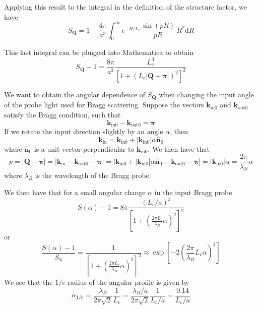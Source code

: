 \documentclass[11pt,letter]{article}
\newcommand{\bv}[1]{\ensuremath{\bm{#1}}}
\begin{document}
Applying this result to the integral in the definition of the structure factor,
we have
\begin{equation}
S_{\bv{Q}} = 1 +  
   \frac{4\pi}{a^{3}}
   \int_{0}^{\infty}  
   e^{-R/ L_{c} }  
   \frac{ \sin(pR)}{pR}\, R^{2} 
  \mathrm{d}R
\end{equation}

This last integral can be plugged into Mathematica to obtain
\begin{equation}
S_{\bv{Q}} - 1 = 
    \frac{8\pi}{a^{3}} 	\frac{ L_{c}^{3} }
     { \left[ 1 + (L_{c} |\bv{Q}-\bv{\pi}|)^{2}  \right]^{2} } 
\end{equation}

We want to obtain the angular dependence of $S_{\bv{Q}}$ when changing the
input angle of the probe light used for Bragg scattering.  Suppose the vectors
$\bv{k}_{\text{in}0}$ and $\bv{k}_{\text{out}0}$ satisfy the Bragg condition,
such that
\begin{equation}
 \bv{k}_{\text{in}0} - 
 \bv{k}_{\text{out}0}   = \bv{\pi} 
\end{equation} 
If we rotate the input direction slightly by an angle $\alpha$, then 
\begin{equation} 
 \bv{k}_{\text{in}} = 
 \bv{k}_{\text{in}0}  +  
 |\bv{k}_{\text{in}0}|\alpha \bv{\hat{n}}_{0}
\end{equation}
where $\bv{\hat{n}}_{0}$ is a unit vector perpendicular to
$\bv{k}_{\text{in}0}$.  We then have that 
\begin{equation} 
 p = | \bv{Q} - \bv{\pi} | = 
 | \bv{k}_{\text{in}} - 
 \bv{k}_{\text{out}0}  - \bv{\pi}  | =
 |\bv{k}_{\text{in}0}  +  
 |\bv{k}_{\text{in}0}|\alpha \bv{\hat{n}}_{0} - 
 \bv{k}_{\text{out}0}  - \bv{\pi} |  = 
 |\bv{k}_{\text{in}0}|\alpha  = \frac{2\pi}{\lambda_{B}} \alpha  
\end{equation}
where $\lambda_{B}$ is the wavelength of the Bragg probe.

We then have that for a small angular change $\alpha$ in the input Bragg probe
\begin{equation}
S(\alpha) - 1 = 
    8\pi \frac{ (L_{c}/a)^{3} }
     { \left[ 1 + \left(\frac{2\pi L_{c}}{\lambda_{B}} \alpha \right)^{2}   \right]^{2} } 
\end{equation}
or 
\begin{equation}
\frac{S(\alpha) - 1}{ S_{\bv{\pi}}} = 
     \frac{ 1 }
   { \left[ 1 + \left(\frac{2\pi L_{c}}{\lambda_{B}} \alpha \right)^{2}  
        \right]^{2} } 
  \approx \exp\left[ -2 \left( \frac{2\pi}{\lambda_{B}} L_{c} \alpha\right)^{2} \right]
\end{equation}
We see  that the $1/e$ radius of the angular profile is given by
\begin{equation}
 \alpha_{1/e} = \frac{ \lambda_{B}}{ 2\pi\sqrt{2}} \frac{1}{L_{c}}  
  =  \frac{ \lambda_{B}/a}{ 2\pi\sqrt{2}} \frac{1}{L_{c}/a}  
  =   \frac{0.14}{L_{c}/a} 
\end{equation}
\end{document}
